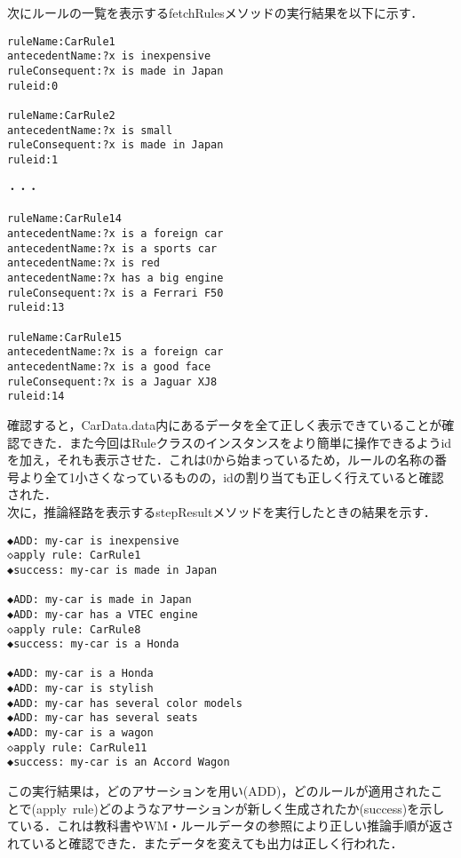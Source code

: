 \documentclass[12pt]{jarticle}
\begin{document}
次にルールの一覧を表示するfetchRulesメソッドの実行結果を以下に示す．
\begin{lstlisting}[caption=fetchRulesメソッドの実行結果,label=kekka1]
ruleName:CarRule1
antecedentName:?x is inexpensive
ruleConsequent:?x is made in Japan
ruleid:0

ruleName:CarRule2
antecedentName:?x is small
ruleConsequent:?x is made in Japan
ruleid:1

・・・

ruleName:CarRule14
antecedentName:?x is a foreign car
antecedentName:?x is a sports car
antecedentName:?x is red
antecedentName:?x has a big engine
ruleConsequent:?x is a Ferrari F50
ruleid:13

ruleName:CarRule15
antecedentName:?x is a foreign car
antecedentName:?x is a good face
ruleConsequent:?x is a Jaguar XJ8
ruleid:14
\end{lstlisting}
確認すると，CarData.data内にあるデータを全て正しく表示できていることが確認できた．また今回はRuleクラスのインスタンスをより簡単に操作できるようidを加え，それも表示させた．これは0から始まっているため，ルールの名称の番号より全て1小さくなっているものの，idの割り当ても正しく行えていると確認された．\\

次に，推論経路を表示するstepResultメソッドを実行したときの結果を示す．
\begin{lstlisting}[caption=stepResultメソッドの実行結果,label=kekka2]
◆ADD: my-car is inexpensive
◇apply rule: CarRule1
◆success: my-car is made in Japan

◆ADD: my-car is made in Japan
◆ADD: my-car has a VTEC engine
◇apply rule: CarRule8
◆success: my-car is a Honda

◆ADD: my-car is a Honda
◆ADD: my-car is stylish
◆ADD: my-car has several color models
◆ADD: my-car has several seats
◆ADD: my-car is a wagon
◇apply rule: CarRule11
◆success: my-car is an Accord Wagon
\end{lstlisting}
この実行結果は，どのアサーションを用い(ADD)，どのルールが適用されたことで(apply\ rule)どのようなアサーションが新しく生成されたか(success)を示している．これは教科書やWM・ルールデータの参照により正しい推論手順が返されていると確認できた．またデータを変えても出力は正しく行われた．\\
\end{document}
